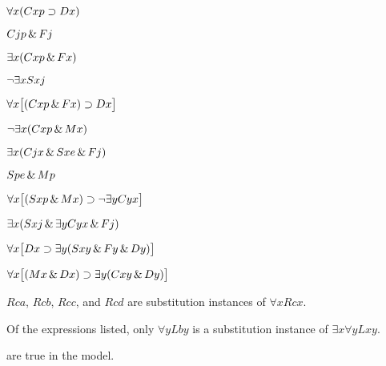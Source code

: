 \begin{earg}
\item %
$\forall x(Cxp \supset Dx)$
\item %
$Cjp \,\&\, Fj$
\item %
$\exists x(Cxp \,\&\, Fx)$
\item %
$\neg\exists x Sxj$
\item %
$\forall x\bigl[(Cxp \,\&\, Fx)\supset Dx\bigr]$
\item %
$\neg\exists x(Cxp \,\&\, Mx)$
\item %
$\exists x(Cjx \,\&\, Sxe \,\&\, Fj)$
\item %
$Spe \,\&\, Mp$
\item %
$\forall x\bigl[(Sxp \,\&\, Mx) \supset \neg\exists y Cyx\bigr]$
\item %
$\exists x(Sxj \,\&\, \exists y Cyx \,\&\, Fj)$
\item %
$\forall x\bigl[Dx \supset \exists y(Sxy \,\&\, Fy \,\&\, Dy)\bigr]$
\item %
$\forall x\bigl[(Mx \,\&\, Dx) \supset \exists y(Cxy \,\&\, Dy)\bigr]$
\end{earg}

\begin{earg}
\item $Rca$, $Rcb$, $Rcc$, and $Rcd$ are substitution instances of $\forall x Rcx$.
\item Of the expressions listed, only $\forall y Lby$ is a substitution instance of $\exists x\forall y Lxy$.
\end{earg}



\noSeq
\nextSeq
\nextSeq
\nextSeq
\noSeq
\nextSeq
\noSeq
\nextSeq
\lastSeq
are true in the model.

